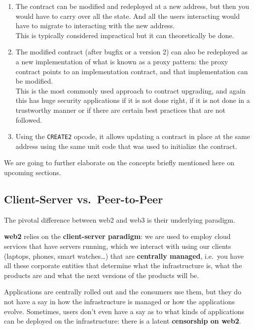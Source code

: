 \begin{enumerate}
\def\labelenumi{\arabic{enumi}.}
\item
  The contract can be modified and redeployed at a new address, but then
  you would have to carry over all the state. And all the users
  interacting would have to migrate to interacting with the new
  address.\\

  This is typically considered impractical but it can theoretically be
  done.
\item
  The modified contract (after bugfix or a version 2) can also be
  redeployed as a new implementation of what is known as a proxy
  pattern: the proxy contract points to an implementation contract, and
  that implementation can be modified.\\

  This is the most commonly used approach to contract upgrading, and
  again this has huge security applications if it is not done right, if
  it is not done in a trustworthy manner or if there are certain best
  practices that are not followed.
\item
  Using the \texttt{CREATE2} opcode, it allows updating a contract in
  place at the same address using the same unit code that was used to
  initialize the contract.
\end{enumerate}

We are going to further elaborate on the concepts briefly mentioned here
on upcoming sections.

\subsection{Client-Server
vs.~Peer-to-Peer}\label{client-server-vs.-peer-to-peer}

The pivotal difference between web2 and web3 is their underlying
paradigm.

\textbf{web2} relies on the \textbf{client-server paradigm}: we are used
to employ cloud services that have servers running, which we interact
with using our clients (laptops, phones, smart watches\dots) that are
\textbf{centrally managed}, i.e.~you have all these corporate entities
that determine what the infrastructure is, what the products are and
what the next versions of the products will be.

Applications are centrally rolled out and the consumers use them, but
they do not have a say in how the infrastructure is managed or how the
applications evolve. Sometimes, users don't even have a say as to what
kinds of applications can be deployed on the infrastructure: there is a
latent \textbf{censorship on web2}.

